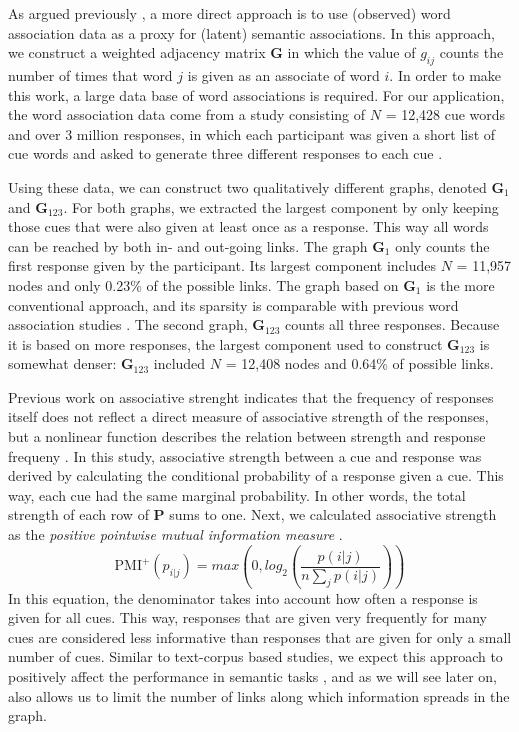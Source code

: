 \documentclass[doc]{apa6}
\begin{document}
As argued previously \parencite[e.g.,][]{DeDeyne2014CorpusSize}, a more direct approach is to use (observed) word association data as a proxy for (latent) semantic associations. In this approach, we construct a weighted adjacency matrix $\mathbf{G}$ in which the value of $g_{ij}$ counts the number of times that word $j$ is given as an associate of word $i$. In order to make this work, a large data base of word associations is required. For our application, the word association data come from a study consisting of $N$ = 12,428 cue words and over 3 million responses, in which each participant was given a short list of cue words and asked to generate three different responses to each cue \parencite[see][]{DeDeyne2008a,DeDeyne2011}.

Using these data, we can construct two qualitatively different graphs, denoted  $\mathbf{G}_1$ and $\mathbf{G}_{123}$. For both graphs, we extracted the largest component by only keeping those cues that were also given at least once as a response. This way all words can be reached by both in- and out-going links. The graph $\mathbf{G}_1$ only counts the  first response given by the participant.
Its largest component includes $N$ = 11,957 nodes and only 0.23\% of the possible links. The graph based on $\mathbf{G}_1$ is the more conventional approach, and its sparsity is comparable with previous word association studies \parencite{Nelson2004}. The second graph, $\mathbf{G}_{123}$ counts all three responses. Because it is based on more responses, the largest component used to construct $\mathbf{G}_{123}$ is somewhat denser: $\mathbf{G}_{123}$ included $N$ = 12,408 nodes and 0.64\% of possible links.

Previous work on associative strenght indicates that the frequency of responses itself does not reflect a direct measure of associative strength of the responses, but a nonlinear function describes the relation between strength and response frequeny \parencite[see p 10][]{Deese1965}. In this study, associative strength between a cue and response was derived by calculating the conditional probability of a response given a cue. This way, each cue had the same  marginal probability. In other words, the total strength of each row of $\mathbf{P}$ sums to one. Next, we calculated associative strength as the {\it positive pointwise mutual information measure} \parencite[see][]{Jurafsky2008}.
\begin{equation}
\mbox{PMI}^+(p_{i|j}) = max\left(0,log_2 \left(\frac{p(i|j)}{n \sum_j p(i|j)} \right)\right)
\end{equation}
In this equation, the denominator takes into account how often a response is given for all cues.
This way, responses that are given very frequently for many cues are considered less informative than responses that are given for only a small number of cues. Similar to text-corpus based studies, we expect this approach to positively affect the performance in semantic tasks \parencite{Bullinaria2007}, and as we will see later on, also allows us to limit the number of links along which information spreads in the graph.
\end{document}
